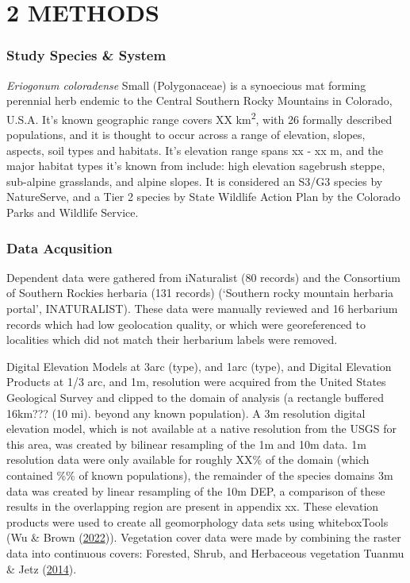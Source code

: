 \documentclass[
]{article}
\begin{document}
\hypertarget{methods}{%
\section{2 \textbar{} METHODS}\label{methods}}

\hypertarget{study-species-system}{%
\subsubsection{Study Species \& System}\label{study-species-system}}

\emph{Eriogonum coloradense} Small (Polygonaceae) is a synoecious mat
forming perennial herb endemic to the Central Southern Rocky Mountains
in Colorado, U.S.A. It's known geographic range covers XX
km\textsuperscript{2}, with 26 formally described populations, and it is
thought to occur across a range of elevation, slopes, aspects, soil
types and habitats. It's elevation range spans xx - xx m, and the major
habitat types it's known from include: high elevation sagebrush steppe,
sub-alpine grasslands, and alpine slopes. It is considered an S3/G3
species by NatureServe, and a Tier 2 species by State Wildlife Action
Plan by the Colorado Parks and Wildlife Service.

\hypertarget{data-acqusition}{%
\subsubsection{Data Acqusition}\label{data-acqusition}}

Dependent data were gathered from iNaturalist (80 records) and the
Consortium of Southern Rockies herbaria (131 records) ({`Southern rocky
mountain herbaria portal'}, INATURALIST). These data were manually
reviewed and 16 herbarium records which had low geolocation quality, or
which were georeferenced to localities which did not match their
herbarium labels were removed.

Digital Elevation Models at 3arc (type), and 1arc (type), and Digital
Elevation Products at 1/3 arc, and 1m, resolution were acquired from the
United States Geological Survey and clipped to the domain of analysis (a
rectangle buffered 16km??? (10 mi). beyond any known population). A 3m
resolution digital elevation model, which is not available at a native
resolution from the USGS for this area, was created by bilinear
resampling of the 1m and 10m data. 1m resolution data were only
available for roughly XX\% of the domain (which contained \%\% of known
populations), the remainder of the species domains 3m data was created
by linear resampling of the 10m DEP, a comparison of these results in
the overlapping region are present in appendix xx. These elevation
products were used to create all geomorphology data sets using
whiteboxTools (Wu \& Brown
(\protect\hyperlink{ref-wu2022whitebox}{2022})). Vegetation cover data
were made by combining the raster data into continuous covers: Forested,
Shrub, and Herbaceous vegetation Tuanmu \& Jetz
(\protect\hyperlink{ref-tuanmu2014global}{2014}).
\end{document}
